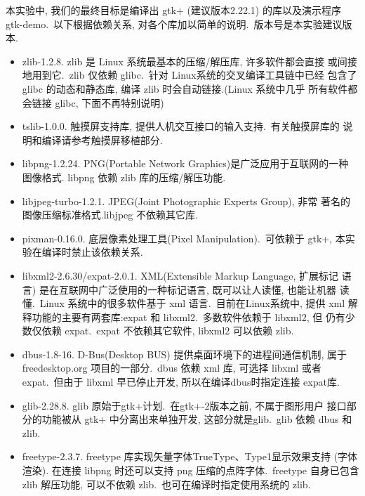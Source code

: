 本实验中, 我们的最终目标是编译出 gtk+ (建议版本2.22.1) 的库以及演示程序
gtk-demo.~以下根据依赖关系, 对各个库加以简单的说明.~版本号是本实验建议版本.
\begin{itemize}
  \item zlib-1.2.8. zlib 是 Linux 系统最基本的压缩/解压库, 许多软件都会直接
      或间接地用到它.~zlib 仅依赖 glibc.~针对 Linux系统的交叉编译工具链中已经
      包含了 glibc 的动态和静态库, 编译 zlib 时会自动链接.(Linux 系统中几乎
      所有软件都会链接 glibc, 下面不再特别说明)

  \item tslib-1.0.0. 触摸屏支持库, 提供人机交互接口的输入支持.~有关触摸屏库的
      说明和编译请参考触摸屏移植部分.

  \item libpng-1.2.24. PNG(Portable Network Graphics)是广泛应用于互联网的一种
      图像格式. libpng 依赖 zlib 库的压缩/解压功能.

  \item libjpeg-turbo-1.2.1. JPEG(Joint Photographic Experts Group), 非常
      著名的图像压缩标准格式.libjpeg 不依赖其它库.

  \item pixman-0.16.0. 底层像素处理工具(Pixel Manipulation).~可依赖于 gtk+,
      本实验在编译时禁止该依赖关系.

  \item libxml2-2.6.30/expat-2.0.1. XML(Extensible Markup Language, 扩展标记
      语言) 是在互联网中广泛使用的一种标记语言, 既可以让人读懂, 也能让机器
      读懂.~Linux 系统中的很多软件基于 xml 语言.~目前在Linux系统中, 提供 xml
      解释功能的主要有两套库:expat 和 libxml2.~多数软件依赖于 libxml2, 但
      仍有少数仅依赖 expat.~expat 不依赖其它软件, libxml2 可以依赖 zlib.

  \item dbus-1.8-16. D-Bus(Desktop BUS) 提供桌面环境下的进程间通信机制, 属于
      freedesktop.org 项目的一部分.~dbus 依赖 xml 库, 可选择 libxml 或者
      expat.~但由于 libxml 早已停止开发, 所以在编译dbus时指定连接 expat库.

  \item glib-2.28.8. glib 原始于gtk+计划.~在gtk+-2版本之前, 不属于图形用户
      接口部分的功能被从 gtk+ 中分离出来单独开发, 这部分就是glib.~glib 依赖
      dbus 和 zlib.

  \item freetype-2.3.7. freetype 库实现矢量字体TrueType、Type1显示效果支持
      (字体渲染). 在连接 libpng 时还可以支持 png 压缩的点阵字体.~freetype
      自身已包含 zlib 解压功能, 可以不依赖 zlib.~也可在编译时指定使用系统的
      zlib.


\end{itemize}
